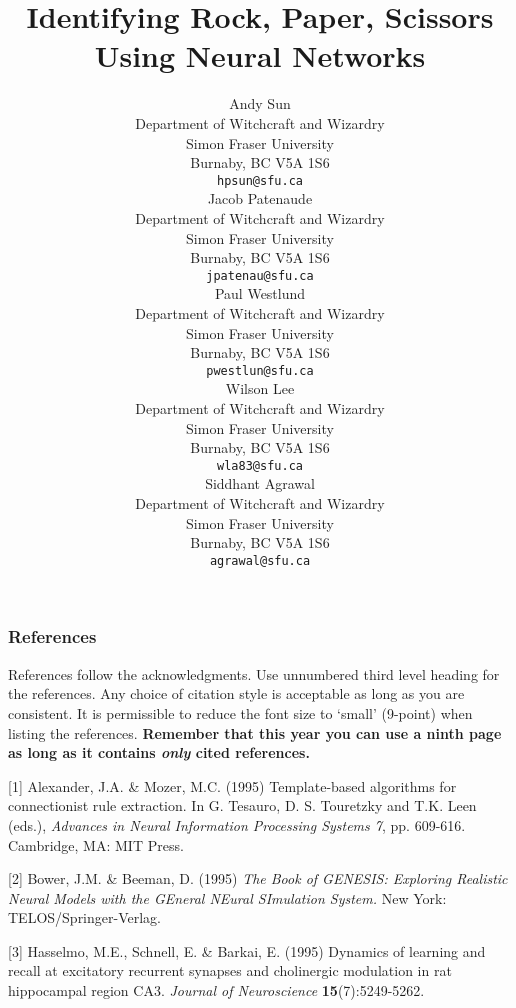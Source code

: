 \documentclass{article} %
\title{Identifying Rock, Paper, Scissors Using Neural Networks}
\author{
Andy Sun \\
Department of Witchcraft and Wizardry\\
Simon Fraser University\\
Burnaby, BC V5A 1S6 \\
\texttt{hpsun@sfu.ca} \\
\And
Jacob Patenaude \\
Department of Witchcraft and Wizardry\\
Simon Fraser University\\
Burnaby, BC V5A 1S6 \\
\texttt{jpatenau@sfu.ca} \\
\And
Paul Westlund \\
Department of Witchcraft and Wizardry\\
Simon Fraser University\\
Burnaby, BC V5A 1S6 \\
\texttt{pwestlun@sfu.ca} \\
\And
Wilson Lee \\
Department of Witchcraft and Wizardry\\
Simon Fraser University\\
Burnaby, BC V5A 1S6 \\
\texttt{wla83@sfu.ca} \\
\And
Siddhant Agrawal \\
Department of Witchcraft and Wizardry\\
Simon Fraser University\\
Burnaby, BC V5A 1S6 \\
\texttt{agrawal@sfu.ca} \\
}
\begin{document}
\maketitle

\begin{abstract}

\end{abstract}













\subsubsection*{References}

References follow the acknowledgments. Use unnumbered third level heading for
the references. Any choice of citation style is acceptable as long as you are
consistent. It is permissible to reduce the font size to `small' (9-point) 
when listing the references. {\bf Remember that this year you can use
a ninth page as long as it contains \emph{only} cited references.}

\small{
[1] Alexander, J.A. \& Mozer, M.C. (1995) Template-based algorithms
for connectionist rule extraction. In G. Tesauro, D. S. Touretzky
and T.K. Leen (eds.), {\it Advances in Neural Information Processing
Systems 7}, pp. 609-616. Cambridge, MA: MIT Press.

[2] Bower, J.M. \& Beeman, D. (1995) {\it The Book of GENESIS: Exploring
Realistic Neural Models with the GEneral NEural SImulation System.}
New York: TELOS/Springer-Verlag.

[3] Hasselmo, M.E., Schnell, E. \& Barkai, E. (1995) Dynamics of learning
and recall at excitatory recurrent synapses and cholinergic modulation
in rat hippocampal region CA3. {\it Journal of Neuroscience}
{\bf 15}(7):5249-5262.
}
\end{document}
